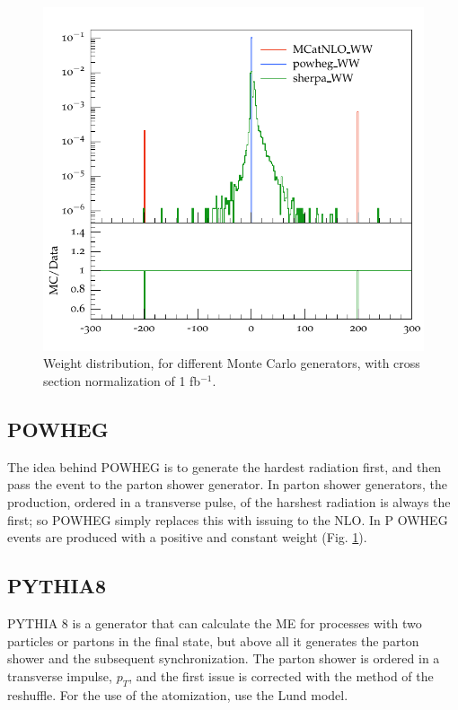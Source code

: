  
 
\begin{figure}
\centering
\includegraphics[scale= 0.7]{../Cap3/Fig_MC/weight}
\caption{Weight distribution, for different Monte Carlo generators, with cross section normalization of 1 fb$^{-1}$.}
\label{weight}
\end{figure}
 
 
\subsection*{P{\footnotesize OWHEG}} The idea behind P{\footnotesize OWHEG} \cite{Oleari:2010nx} is to generate the hardest radiation first, and then pass the event to the parton shower generator. In parton shower generators, the production, ordered in a transverse pulse, of the harshest radiation is always the first; so P{\footnotesize OWHEG} simply replaces this with issuing to the NLO.
In P {\footnotesize OWHEG} events are produced with a positive and constant weight (Fig. \ref{weight}).
 
 
\subsection*{P{\footnotesize YTHIA}8 } P{\footnotesize YTHIA 8} \cite{bib:pythia} is a generator that can calculate the ME for processes with two particles or partons in the final state, but above all it generates the parton shower and the subsequent synchronization. The parton shower is ordered in a transverse impulse, $ p_T $, and the first issue is corrected with the method of the reshuffle. For the use of the atomization, use the Lund model.
 
